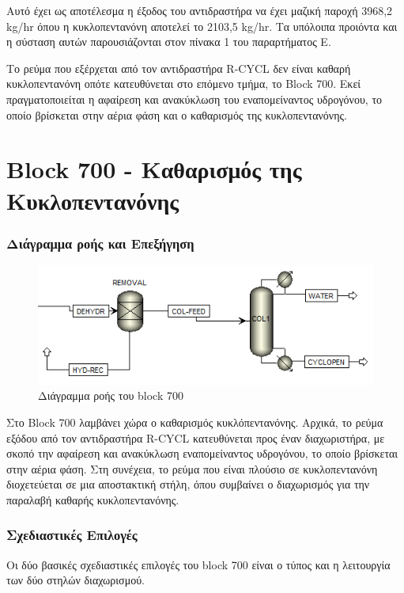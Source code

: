 \documentclass[11pt]{article}
\begin{document}
Αυτό έχει ως αποτέλεσμα η έξοδος του αντιδραστήρα να έχει μαζική παροχή
3968,2 kg/hr όπου η κυκλοπεντανόνη αποτελεί το 2103,5 kg/hr. Τα υπόλοιπα
προιόντα και η σύσταση αυτών παρουσιάζονται στον πίνακα 1 του
παραρτήματος Ε.

Το ρεύμα που εξέρχεται από τον αντιδραστήρα R-CYCL δεν είναι καθαρή
κυκλοπεντανόνη οπότε κατευθύνεται στο επόμενο τμήμα, το Block 700. Εκεί
πραγματοποιείται η αφαίρεση και ανακύκλωση του εναπομείναντος υδρογόνου,
το οποίο βρίσκεται στην αέρια φάση και ο καθαρισμός της κυκλοπεντανόνης.

\section{Block 700 - Καθαρισμός της Κυκλοπεντανόνης}
\label{sec:orgce608cc}
\subsubsection{Διάγραμμα ροής και Επεξήγηση}
\label{sec:org1a228b4}
\begin{figure}[htbp]
\centering
\includegraphics[width=.9\linewidth]{Block_700_-_Καθαρισμός_της_Κυκλοπεντανόνης/2023-01-13_18-02-03_screenshot.png}
\caption{Διάγραμμα ροής του block 700}
\end{figure}

Στο Block 700 λαμβάνει χώρα ο καθαρισμός κυκλόπεντανόνης. Αρχικά, το
ρεύμα εξόδου από τον αντιδραστήρα R-CYCL κατευθύνεται προς έναν
διαχωριστήρα, με σκοπό την αφαίρεση και ανακύκλωση εναπομείναντος
υδρογόνου, το οποίο βρίσκεται στην αέρια φάση. Στη συνέχεια, το ρεύμα
που είναι πλούσιο σε κυκλοπεντανόνη διοχετεύεται σε μια αποστακτική
στήλη, όπου συμβαίνει ο διαχωρισμός για την παραλαβή καθαρής
κυκλοπεντανόνης.

\subsubsection{Σχεδιαστικές Επιλογές}
\label{sec:org26e146c}
Οι δύο βασικές σχεδιαστικές επιλογές του block 700 είναι ο τύπος και η
λειτουργία των δύο στηλών διαχωρισμού.
\end{document}
